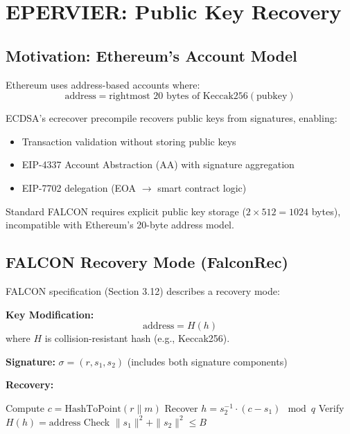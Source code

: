\section{EPERVIER: Public Key Recovery}


\subsection{Motivation: Ethereum's Account Model}

Ethereum uses address-based accounts where:
\begin{equation}
\text{address} = \text{rightmost 20 bytes of } \text{Keccak256}(\text{pubkey})
\end{equation}

ECDSA's ecrecover precompile recovers public keys from signatures, enabling:
\begin{itemize}
    \item Transaction validation without storing public keys
    \item EIP-4337 Account Abstraction (AA) with signature aggregation
    \item EIP-7702 delegation (EOA $\rightarrow$ smart contract logic)
\end{itemize}

Standard FALCON requires explicit public key storage ($2 \times 512 = 1024$ bytes), incompatible with Ethereum's 20-byte address model.

\subsection{FALCON Recovery Mode (FalconRec)}

FALCON specification (Section 3.12) \cite{falcon2020} describes a recovery mode:

\textbf{Key Modification:}
\begin{equation}
\text{address} = H(h)
\end{equation}
where $H$ is collision-resistant hash (e.g., Keccak256).

\textbf{Signature:} $\sigma = (r, s_1, s_2)$ (includes both signature components)

\textbf{Recovery:}
\begin{algorithmic}[1]
\STATE Compute $c = \text{HashToPoint}(r \| m)$
\STATE Recover $h = s_2^{-1} \cdot (c - s_1) \mod q$
\STATE Verify $H(h) = \text{address}$
\STATE Check $\|s_1\|^2 + \|s_2\|^2 \leq B$
\end{algorithmic}

